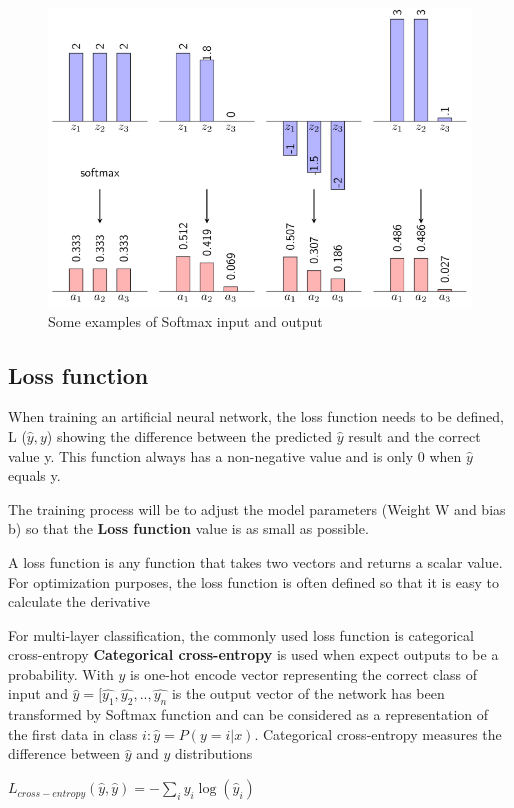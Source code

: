 \begin{center}
	\begin{figure}[H]
		\centering
		\includegraphics[width=0.75\columnwidth]{images/chap2/Softmax.png}
		\caption{Some examples of Softmax input and output}
		\label{chap2:softmax}
		
	\end{figure}
\end{center}
\vspace{-1cm}
\subsection{Loss function}
When training an artificial neural network, the loss function needs to be defined, L ($\hat{y}, y$) showing the difference between the predicted $\hat{y}$ result and the correct value y. This function always has a non-negative value and is only 0 when $\hat{y}$ equals y.

The training process will be to adjust the model parameters (Weight W and bias b) so that the \textbf{Loss function} value is as small as possible.

A loss function is any function that takes two vectors and returns a scalar value. For optimization purposes, the loss function is often defined so that it is easy to calculate the derivative

For multi-layer classification, the commonly used loss function is categorical cross-entropy
\textbf{Categorical cross-entropy} is used when expect outputs to be a probability.
With $y$ is one-hot encode vector representing the correct class of input and $\hat{y} = [\hat{y_1},\hat{y_2},..,\hat{y_n}$ is the output vector of the network has been transformed by Softmax function and can be considered as a representation of the first data in class $i: \hat{y} = P(y = i|x)$. Categorical cross-entropy measures the difference between $\hat{y}$ and $y$ distributions
\begin{center}
	$L_{cross-entropy}(\hat{y},\hat{y}) = - \sum\limits_{i}y_{i}\log(\hat{y}_{i})$
\end{center}
